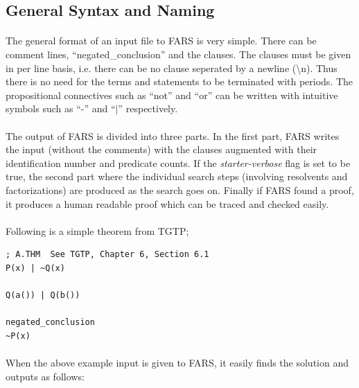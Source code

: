 \documentclass[11pt]{report}
\begin{document}
\subsection{General Syntax and Naming}

\paragraph{} The general format of an input file to FARS is very simple. There can be comment lines, ``negated\_conclusion'' and the clauses. The clauses must be given in per line basis, i.e. there can be no clause seperated by a newline (\textbackslash n). Thus there is no need for the terms and statements to be terminated with periods. The propositional connectives such as ``not'' and ``or'' can be written with intuitive symbols such as ``-'' and ``$|$'' respectively.

\paragraph{} The output of FARS is divided into three parts. In the first part, FARS writes the input (without the comments) with the clauses augmented with their identification number and predicate counts. If the \textit{starter-verbose} flag is set to be true, the second part where the individual search steps (involving resolvents and factorizations) are produced as the search goes on. Finally if FARS found a proof, it produces a human readable proof which can be traced and checked easily.

\paragraph{} Following is a simple theorem from TGTP;


\begin{lstlisting}
; A.THM  See TGTP, Chapter 6, Section 6.1
P(x) | ~Q(x)

Q(a()) | Q(b())
 
negated_conclusion
~P(x) 
\end{lstlisting}

\paragraph{} When the above example input is given to FARS, it easily finds the solution and outputs as follows:
\end{document}
